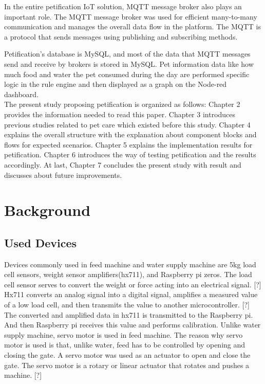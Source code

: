 \documentclass[conference]{IEEEtran}
\begin{document}
In the entire petification IoT solution, MQTT message broker also plays an important role. The MQTT message broker was used for efficient many-to-many communication and manages the overall data flow in the platform. The MQTT is a protocol that sends messages using publishing and subscribing methods.

Petification's database is MySQL, and most of the data that MQTT messages send and receive by brokers is stored in MySQL.
Pet information data like how much food and water the pet consumed during the day are performed specific logic in the rule engine and then displayed as a graph on the Node-red dashboard.
\\

The present study proposing petification is organized as follows:
Chapter 2 
provides the information needed to read this paper.
Chapter 3 
introduces previous studies related to pet care which existed before this study. 
Chapter 4 
explains the overall structure with the explanation about component blocks and flows for expected scenarios.
Chapter 5 
explains the implementation results for petification.
Chapter 6 
introduces the way of testing petification and the results accordingly.
At last, Chapter 7 
concludes the present study with result and discusses about future improvements.

\section{Background}

 \subsection{Used Devices}
Devices commonly used in feed machine and water supply machine are 5kg load cell sensors, weight sensor amplifiers(hx711), and Raspberry pi zeros.
The load cell sensor serves to convert the weight or force acting into an electrical signal. [?] 
Hx711 converts an analog signal into a digital signal, amplifies a measured value of a low load cell, and then transmits the value to another microcontroller. [?]
The converted and amplified data in hx711 is transmitted to the Raspberry pi. And then Raspberry pi receives this value and performs calibration.
\hfill \break
\indent Unlike water supply machine, servo motor is used in feed machine. The reason why servo motor is used is that, unlike water, feed has to be controlled by opening and closing the gate. A servo motor was used as an actuator to open and close the gate. The servo motor is a rotary or linear actuator that rotates and pushes a machine. [?]
\end{document}

